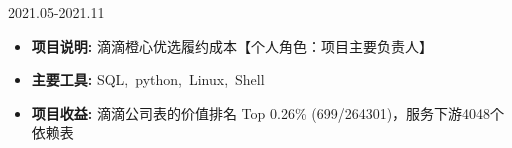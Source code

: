 \documentclass{resume}
\begin{document}
\medskip










                      {2021.05-2021.11}

\begin{itemize}  [parsep=0.5ex]

  \item   \textbf{  项目说明:  }   { 滴滴橙心优选履约成本【个人角色：项目主要负责人】 } 
  \item   \textbf{  主要工具:  }   {  SQL,\ python,\ Linux,\ Shell }
  \item   \textbf{  项目收益:  }   {  滴滴公司表的价值排名 Top 0.26\% (699/264301)，服务下游4048个依赖表 }

\end{itemize}
\end{document}
